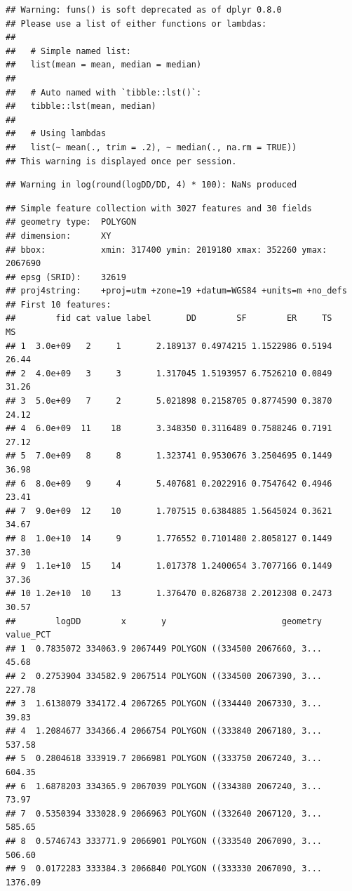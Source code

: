 \documentclass[11pt,]{article}
\begin{document}
\begin{verbatim}
## Warning: funs() is soft deprecated as of dplyr 0.8.0
## Please use a list of either functions or lambdas: 
## 
##   # Simple named list: 
##   list(mean = mean, median = median)
## 
##   # Auto named with `tibble::lst()`: 
##   tibble::lst(mean, median)
## 
##   # Using lambdas
##   list(~ mean(., trim = .2), ~ median(., na.rm = TRUE))
## This warning is displayed once per session.
\end{verbatim}

\begin{verbatim}
## Warning in log(round(logDD/DD, 4) * 100): NaNs produced
\end{verbatim}

\begin{verbatim}
## Simple feature collection with 3027 features and 30 fields
## geometry type:  POLYGON
## dimension:      XY
## bbox:           xmin: 317400 ymin: 2019180 xmax: 352260 ymax: 2067690
## epsg (SRID):    32619
## proj4string:    +proj=utm +zone=19 +datum=WGS84 +units=m +no_defs
## First 10 features:
##        fid cat value label       DD        SF        ER     TS    MS
## 1  3.0e+09   2     1       2.189137 0.4974215 1.1522986 0.5194 26.44
## 2  4.0e+09   3     3       1.317045 1.5193957 6.7526210 0.0849 31.26
## 3  5.0e+09   7     2       5.021898 0.2158705 0.8774590 0.3870 24.12
## 4  6.0e+09  11    18       3.348350 0.3116489 0.7588246 0.7191 27.12
## 5  7.0e+09   8     8       1.323741 0.9530676 3.2504695 0.1449 36.98
## 6  8.0e+09   9     4       5.407681 0.2022916 0.7547642 0.4946 23.41
## 7  9.0e+09  12    10       1.707515 0.6384885 1.5645024 0.3621 34.67
## 8  1.0e+10  14     9       1.776552 0.7101480 2.8058127 0.1449 37.30
## 9  1.1e+10  15    14       1.017378 1.2400654 3.7077166 0.1449 37.36
## 10 1.2e+10  10    13       1.376470 0.8268738 2.2012308 0.2473 30.57
##        logDD        x       y                       geometry value_PCT
## 1  0.7835072 334063.9 2067449 POLYGON ((334500 2067660, 3...     45.68
## 2  0.2753904 334582.9 2067514 POLYGON ((334500 2067390, 3...    227.78
## 3  1.6138079 334172.4 2067265 POLYGON ((334440 2067330, 3...     39.83
## 4  1.2084677 334366.4 2066754 POLYGON ((333840 2067180, 3...    537.58
## 5  0.2804618 333919.7 2066981 POLYGON ((333750 2067240, 3...    604.35
## 6  1.6878203 334365.9 2067039 POLYGON ((334380 2067240, 3...     73.97
## 7  0.5350394 333028.9 2066963 POLYGON ((332640 2067120, 3...    585.65
## 8  0.5746743 333771.9 2066901 POLYGON ((333540 2067090, 3...    506.60
## 9  0.0172283 333384.3 2066840 POLYGON ((333330 2067090, 3...   1376.09

\end{verbatim}
\end{document}

